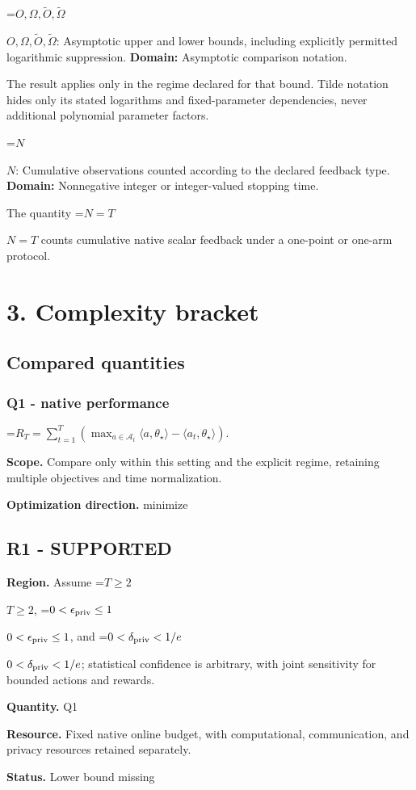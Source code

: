 \documentclass[10pt,a4paper]{article}
\newcommand{\AtlasMath}[1]{\par\begingroup\centering\setbox0=\hbox{$\displaystyle #1$}\ifdim\wd0>1.4\linewidth\typeout{ATLAS WIDE FORMULA: \the\wd0}\fi\ifdim\wd0>\linewidth\resizebox{\linewidth}{!}{\box0}\else\box0\fi\par\endgroup}
\newcommand{\AtlasInlineMath}[1]{\begingroup\setbox0=\hbox{$#1$}\ifdim\wd0>.4\linewidth\endgroup\AtlasMath{#1}\else\endgroup$#1$\fi}
\begin{document}
\AtlasInlineMath{O,\Omega,\widetilde O,\widetilde\Omega}: Asymptotic upper and lower bounds, including explicitly permitted logarithmic suppression. \textbf{Domain:} Asymptotic comparison notation.

The result applies only in the regime declared for that bound. Tilde notation hides only its stated logarithms and fixed-parameter dependencies, never additional polynomial parameter factors.

\AtlasInlineMath{N}: Cumulative observations counted according to the declared feedback type. \textbf{Domain:} Nonnegative integer or integer-valued stopping time.

The quantity \AtlasInlineMath{N=T} counts cumulative native scalar feedback under a one-point or one-arm protocol.

\section{3. Complexity bracket}
\subsection{Compared quantities}
\subsubsection{Q1 - native performance}
\AtlasMath{R_T=\sum_{t=1}^{T}\left(\max_{a\in\mathcal A_t}\langle a,\theta_\star\rangle-\langle a_t,\theta_\star\rangle\right).}
\textbf{Scope.} Compare only within this setting and the explicit regime, retaining multiple objectives and time normalization.

\textbf{Optimization direction.} minimize

\subsection{R1 - SUPPORTED}
\textbf{Region.} Assume \AtlasInlineMath{T\ge 2}, \AtlasInlineMath{0<\epsilon_{\rm priv}\le 1}, and \AtlasInlineMath{0<\delta_{\rm priv}<1/e}; statistical confidence is arbitrary, with joint sensitivity for bounded actions and rewards.

\textbf{Quantity.} Q1

\textbf{Resource.} Fixed native online budget, with computational, communication, and privacy resources retained separately.

\textbf{Status.} Lower bound missing
\end{document}
